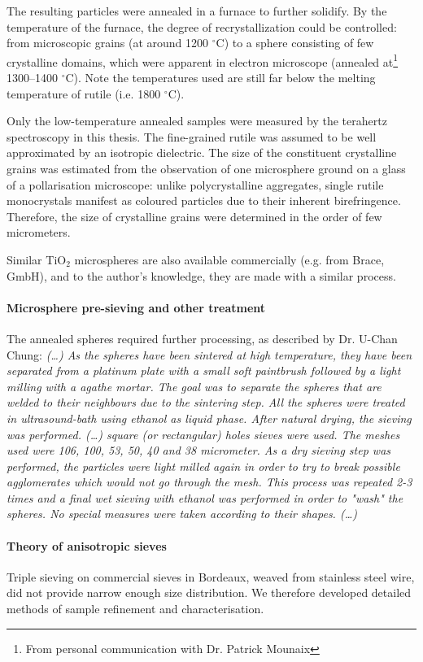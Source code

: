 The resulting particles were annealed in a furnace to further solidify. By the temperature of the furnace, the degree of recrystallization could be controlled: from microscopic grains (at around 1200  $^{\circ}$C) to a sphere consisting of few crystalline domains, which were apparent in electron microscope (annealed at\footnote{From personal communication with Dr. Patrick Mounaix} 1300--1400 $^{\circ}$C). Note the temperatures used are still far below the melting temperature of rutile (i.e. 1800 $^{\circ}$C).

Only the low-temperature annealed samples were measured by the terahertz spectroscopy in this thesis. The fine-grained rutile was assumed to be well approximated by an isotropic dielectric. The size of the constituent crystalline grains was estimated from the observation of one microsphere ground on a glass of a pollarisation microscope: unlike polycrystalline aggregates, single rutile monocrystals manifest as coloured particles due to their inherent birefringence. Therefore, the size of crystalline grains were determined in the order of few micrometers.

Similar TiO$_{2}$ microspheres are also available commercially (e.g. from Brace, GmbH), and to the author's knowledge, they are made with a similar process.

\paragraph{Microsphere pre-sieving and other treatment}
The annealed spheres required further processing, as described by {Dr.} U-Chan Chung: 
\textit{
(\ldots) As the spheres have been sintered at high
temperature, they have been separated from a platinum plate with a
small soft paintbrush followed by a light milling with a agathe
mortar. The goal was to separate the spheres that are welded to their
neighbours due to the sintering step. All the spheres were treated in
ultrasound-bath using ethanol as liquid phase. After natural drying,
the sieving was performed. (\ldots) square (or rectangular)
holes sieves were used. The meshes used were 106, 100, 53, 50, 40 and 38
micrometer. As a dry sieving step was performed, the particles were
light milled again in order to try to break possible agglomerates which
would not go through the mesh. This process was repeated 2-3 times and
a final wet sieving with ethanol was performed in order to "wash" the
spheres. No special measures were taken according to their shapes. (\ldots)
}


\paragraph{Theory of anisotropic sieves}
Triple sieving on commercial sieves in Bordeaux, weaved from stainless steel wire, did not provide narrow enough size distribution. We therefore developed detailed methods of sample refinement and characterisation. 


